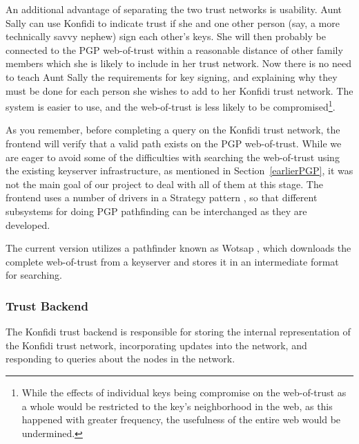 \documentclass[onecolumn]{acm_proc_article-sp}
\begin{document}
An additional advantage of separating the two trust networks is usability.  Aunt Sally can use Konfidi to indicate trust if she and one other person (say, a more technically savvy nephew) sign each other's keys.  She will then probably be connected to the PGP web-of-trust within a reasonable distance of other family members which she is likely to include in her trust network.  Now there is no need to teach Aunt Sally the requirements for key signing, and explaining why they must be done for each person she wishes to add to her Konfidi trust network.  The system is easier to use, and the web-of-trust is less likely to be compromised\footnote{While the effects of individual keys being compromise on the web-of-trust as a whole would be restricted to the key's neighborhood in the web, as this happened with greater frequency, the usefulness of the entire web would be undermined.}.

As you remember, before completing a query on the Konfidi trust network, the frontend will verify that a valid path exists on the PGP web-of-trust.  While we are eager to avoid some of the difficulties with searching the web-of-trust using the existing keyserver infrastructure, as mentioned in Section~\ref{earlierPGP}, it was not the main goal of our project to deal with all of them at this stage.  The frontend uses a number of drivers in a Strategy pattern \cite{designPatterns}, so that different subsystems for doing PGP pathfinding can be interchanged as they are developed.

The current version utilizes a pathfinder known as Wotsap \cite{wotsap}, which downloads the complete web-of-trust from a keyserver and stores it in an intermediate format for searching.

\subsubsection{Trust Backend}
The Konfidi trust backend is responsible for storing the internal representation of the Konfidi trust network, incorporating updates into the network, and responding to queries about the nodes in the network.
\end{document}
